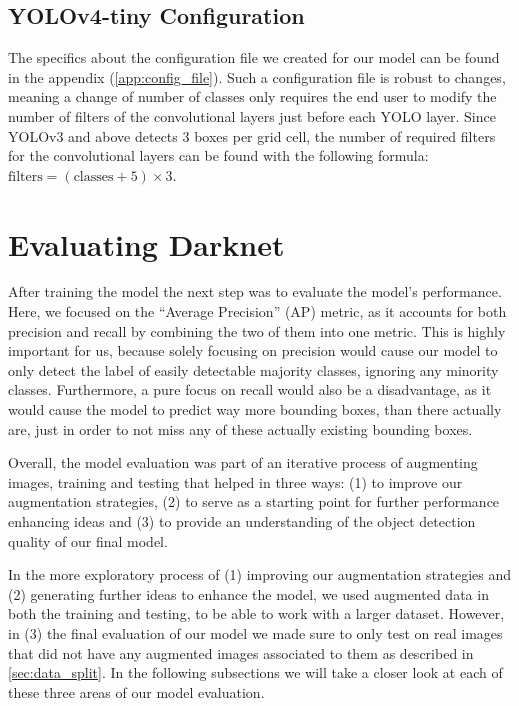 \subsection{YOLOv4-tiny Configuration}
The specifics about the configuration file we created for our model can be found in the appendix (\ref{app:config_file}). Such a configuration file is robust to changes, meaning a change of number of classes only requires the end user to modify the number of filters of the convolutional layers just before each YOLO layer. Since YOLOv3 and above detects 3 boxes per grid cell, the number of required filters for the convolutional layers can be found with the following formula: $ \text{filters} = (\text{classes} + 5) \times 3 $.

\newpage 
\section{Evaluating Darknet}
\label{sec:evaluation}
After training the model the next step was to evaluate the model’s performance. Here, we focused on the “Average Precision” (AP) metric, as it accounts for both precision and recall by combining the two of them into one metric. This is highly important for us, because solely focusing on precision would cause our model to only detect the label of easily detectable majority classes, ignoring any minority classes. Furthermore, a pure focus on recall would also be a disadvantage, as it would cause the model to predict way more bounding boxes, than there actually are, just in order to not miss any of these actually existing bounding boxes.

Overall, the model evaluation was part of an iterative process of augmenting images, training and testing that helped in three ways:
(1) to improve our augmentation strategies, (2) to serve as a starting point for further performance enhancing ideas and (3) to provide an understanding of the object detection quality of our final model.

In the more exploratory process of (1) improving our augmentation strategies and (2) generating further ideas to enhance the model, we used augmented data in both the training and testing, to be able to work with a larger dataset. However, in (3) the final evaluation of our model we made sure to only test on real images that did not have any augmented images associated to them as described in \ref{sec:data_split}.  In the following subsections we will take a closer look at each of these three areas of our model evaluation.
